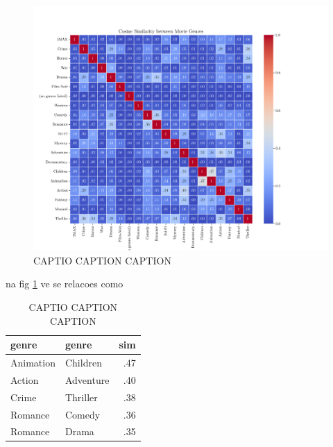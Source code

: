 \documentclass[conference]{IEEEtran}
\begin{document}
\begin{figure}[H]
    \centering
    \includegraphics[width=1\linewidth]{assets/genre_similarity.png}
    \caption{CAPTIO CAPTION CAPTION}
    \label{fig:genre_similarity}
\end{figure}

na fig \ref{fig:genre_similarity} ve se relacoes como 

\begin{table}[H]
\centering
\caption{CAPTIO CAPTION CAPTION}
\label{tab:genre_similarity}
\begin{tabular}{llr}
\toprule
\textbf{genre} & \textbf{genre} & \textbf{sim} \\
\midrule
Animation & Children & .47 \\ 
Action & Adventure & .40 \\
Crime & Thriller & .38 \\
Romance & Comedy & .36 \\
Romance & Drama & .35 \\
\bottomrule
\end{tabular}
\end{table} 
\end{document}
